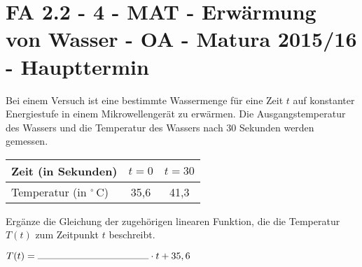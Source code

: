 \section{FA 2.2 - 4 - MAT - Erwärmung von Wasser - OA - Matura 2015/16 - Haupttermin}

\begin{beispiel}[FA 2.2]{1} %
Bei einem Versuch ist eine bestimmte Wassermenge für eine Zeit $t$ auf konstanter Energiestufe in einem Mikrowellengerät zu erwärmen. Die Ausgangstemperatur des Wassers und die Temperatur
des Wassers nach 30 Sekunden werden gemessen.

\begin{center}
\begin{tabular}{|l|c|c|} \hline
\cellcolor{gray!30}Zeit (in Sekunden) & $t=0$ & $t=30$ \\ \hline
\cellcolor{gray!30}Temperatur (in $^\circ$\,C) & 35,6 & 41,3 \\ \hline
\end{tabular}
\end{center} \leer

Ergänze die Gleichung der zugehörigen linearen Funktion, die die Temperatur $T(t)$ zum Zeitpunkt
$t$ beschreibt. \leer

$T(t) = \rule{4cm}{0.3pt} \cdot t + 35,6$

\end{beispiel}